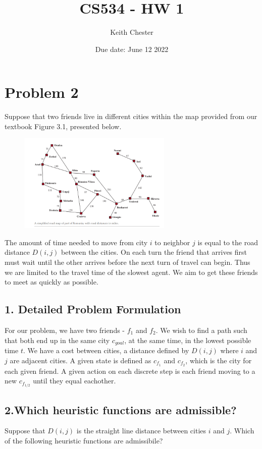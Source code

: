 \documentclass{article}
\title{CS534 - HW 1}
\author{Keith Chester}
\date{Due date: June 12 2022}
\begin{document}
\maketitle

\section*{Problem 2}
Suppose that two friends live in different cities within the map provided from our textbook Figure 3.1, presented below.

\begin{figure}[H]
    \centering
    \includegraphics[width = 0.65\textwidth]{imgs/figure31.png}
    \label{fig:fig31}
\end{figure}

The amount of time needed to move from city $i$ to neighbor $j$ is equal to the road distance $D(i,j)$ between the cities. On each turn the friend that arrives first must wait until the other arrives before the next turn of travel can begin. Thus we are limited to the travel time of the slowest agent. We aim to get these friends to meet as quickly as possible.

\subsection*{1. Detailed Problem Formulation}
For our problem, we have two friends - $f_1$ and $f_2$. We wish to find a path such that both end up in the same city $c_{goal}$, at the same time, in the lowest possible time $t$. We have a cost between cities, a distance defined by $D(i,j)$ where $i$ and $j$ are adjacent cities. A given state is defined as $c_{f_1}$ and $c_{f_2}$, which is the city for each given friend. A given action on each discrete step is each friend moving to a new $c_{f_{1/2}}$ until they equal eachother.

\subsection*{2.Which heuristic functions are admissible?}
Suppose that $D(i, j)$ is the straight line distance between cities $i$ and $j$. Which of the following heuristic functions are admissibile?
\end{document}
